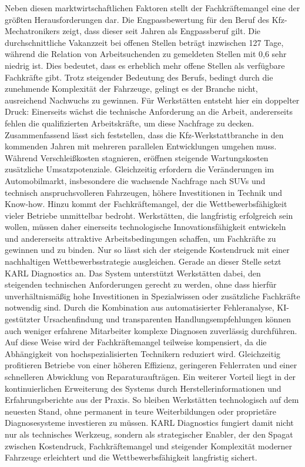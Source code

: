 Neben diesen marktwirtschaftlichen Faktoren stellt der Fachkräftemangel eine der größten Herausforderungen dar. Die Engpassbewertung für den Beruf des Kfz-Mechatronikers zeigt, dass dieser seit Jahren als Engpassberuf gilt. Die durchschnittliche Vakanzzeit bei offenen Stellen beträgt inzwischen 127 Tage, während die Relation von Arbeitsuchenden zu gemeldeten Stellen mit 0,6 sehr niedrig ist. Dies bedeutet, dass es erheblich mehr offene Stellen als verfügbare Fachkräfte gibt. Trotz steigender Bedeutung des Berufs, bedingt durch die zunehmende Komplexität der Fahrzeuge, gelingt es der Branche nicht, ausreichend Nachwuchs zu gewinnen. Für Werkstätten entsteht hier ein doppelter Druck: Einerseits wächst die technische Anforderung an die Arbeit, andererseits fehlen die qualifizierten Arbeitskräfte, um diese Nachfrage zu decken. \citep[vgl.][]{ba2025engpassanalyse2611}
\newline\newline
Zusammenfassend lässt sich feststellen, dass die Kfz-Werkstattbranche in den kommenden Jahren mit mehreren parallelen Entwicklungen umgehen muss. Während Verschleißkosten stagnieren, eröffnen steigende Wartungskosten zusätzliche Umsatzpotenziale. Gleichzeitig erfordern die Veränderungen im Automobilmarkt, insbesondere die wachsende Nachfrage nach SUVs und technisch anspruchsvolleren Fahrzeugen, höhere Investitionen in Technik und Know-how. Hinzu kommt der Fachkräftemangel, der die Wettbewerbsfähigkeit vieler Betriebe unmittelbar bedroht. Werkstätten, die langfristig erfolgreich sein wollen, müssen daher einerseits technologische Innovationsfähigkeit entwickeln und andererseits attraktive Arbeitsbedingungen schaffen, um Fachkräfte zu gewinnen und zu binden. Nur so lässt sich der steigende Kostendruck mit einer nachhaltigen Wettbewerbsstrategie ausgleichen. Gerade an dieser Stelle setzt KARL Diagnostics an. Das System unterstützt Werkstätten dabei, den steigenden technischen Anforderungen gerecht zu werden, ohne dass hierfür unverhältnismäßig hohe Investitionen in Spezialwissen oder zusätzliche Fachkräfte notwendig sind. Durch die Kombination aus automatisierter Fehleranalyse, KI-gestützter Ursachenfindung und transparenten Handlungsempfehlungen können auch weniger erfahrene Mitarbeiter komplexe Diagnosen zuverlässig durchführen. Auf diese Weise wird der Fachkräftemangel teilweise kompensiert, da die Abhängigkeit von hochspezialisierten Technikern reduziert wird. Gleichzeitig profitieren Betriebe von einer höheren Effizienz, geringeren Fehlerraten und einer schnelleren Abwicklung von Reparaturaufträgen. Ein weiterer Vorteil liegt in der kontinuierlichen Erweiterung des Systems durch Herstellerinformationen und Erfahrungsberichte aus der Praxis. So bleiben Werkstätten technologisch auf dem neuesten Stand, ohne permanent in teure Weiterbildungen oder proprietäre Diagnosesysteme investieren zu müssen. KARL Diagnostics fungiert damit nicht nur als technisches Werkzeug, sondern als strategischer Enabler, der den Spagat zwischen Kostendruck, Fachkräftemangel und steigender Komplexität moderner Fahrzeuge erleichtert und die Wettbewerbsfähigkeit langfristig sichert.

